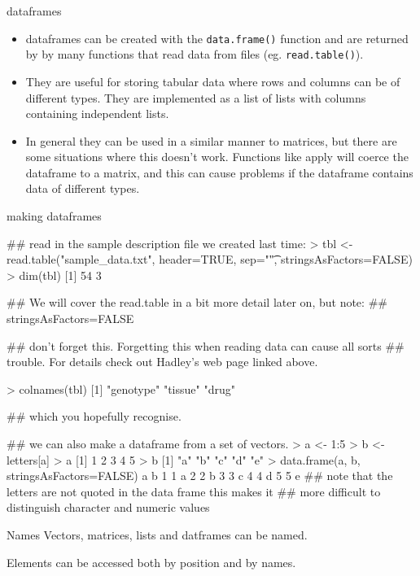 \documentclass[pdf]{beamer}
\begin{document}
\begin{frame}[fragile]{dataframes}
  
  {\small
    \begin{itemize}
      \item dataframes can be created with the \texttt{data.frame()} function
        and are returned by by many functions that read data from files
        (eg. \texttt{read.table()}).
      \item They are useful for storing tabular data where rows and columns
        can be of different types. They are implemented as a list of lists
        with columns containing independent lists.
      \item  In general they can be used in a similar manner to matrices, but
        there are some situations where this doesn't work. Functions like
        apply will coerce the dataframe to a matrix, and this can cause problems
        if the dataframe contains data of different types.
      \end{itemize}
  }
\end{frame}

\begin{frame}[fragile]{making dataframes}

  \begin{rcode}
    ## read in the sample description file we created last time:
    > tbl <- read.table("sample_data.txt", header=TRUE, sep="\t", stringsAsFactors=FALSE)
    > dim(tbl)
    [1] 54  3
    
    ## We will cover the read.table in a bit more detail later on, but note:
    ## stringsAsFactors=FALSE
    
    ## don't forget this. Forgetting this when reading data can cause all sorts
    ## trouble. For details check out Hadley's web page linked above.

    > colnames(tbl)
    [1] "genotype" "tissue"   "drug"    

    ## which you hopefully recognise. 
    
    ## we can also make a dataframe from a set of vectors.
    > a <- 1:5
    > b <- letters[a]
    > a
    [1] 1 2 3 4 5
    > b
    [1] "a" "b" "c" "d" "e"
    > data.frame(a, b, stringsAsFactors=FALSE)
      a b
    1 1 a
    2 2 b
    3 3 c
    4 4 d
    5 5 e
    ## note that the letters are not quoted in the data frame this makes it
    ## more difficult to distinguish character and numeric values
  \end{rcode}
\end{frame}

\begin{frame}{Names}
  Vectors, matrices, lists and datframes can be named.

  Elements can be accessed both by position and by names.
\end{frame}
\end{document}
